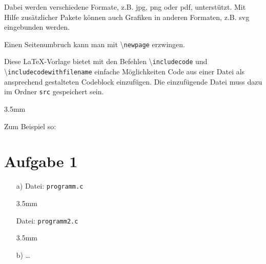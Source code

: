 \documentclass[paper=a4, %
         fontsize=10pt,  %
         oneside,        %
         headsepline,    %
         notitlepage     %
]{scrartcl}              %
\newcommand{\codeind}[1]{\begin{adjustwidth}{3.5mm}{}#1\end{adjustwidth}}
\newcommand{\includecode}[1]{\codeind{}}
\newcommand{\includecodewithfilename}[1]{Datei: \texttt{#1}\vspace*{-1.5mm}\includecode{#1}}
\newcommand{\aufgabe}[1]{\section*{Aufgabe #1}}
\begin{document}
Dabei werden verschiedene Formate, z.B. jpg, png oder pdf, unterstützt.
Mit Hilfe zusätzlicher Pakete können auch Grafiken in anderen Formaten, z.B. svg eingebunden werden.

\bigskip
Einen Seitenumbruch kann man mit \textbackslash\texttt{newpage} erzwingen.
\newpage


Diese \LaTeX-Vorlage bietet mit den Befehlen \textbackslash\texttt{includecode} und \textbackslash\texttt{includecodewithfilename} einfache Möglichkeiten Code aus einer Datei als ansprechend gestalteten Codeblock einzufügen. Die einzufügende Datei muss dazu im Ordner \texttt{src} gespeichert sein.
\includecode{programm.c}

\bigskip

Zum Beispiel so:
\aufgabe{1}
\begin{enumerate}
\item[a)]
\includecodewithfilename{programm.c}
\includecodewithfilename{programm2.c}
\item[b)] \dots
\end{enumerate}

\end{document}
